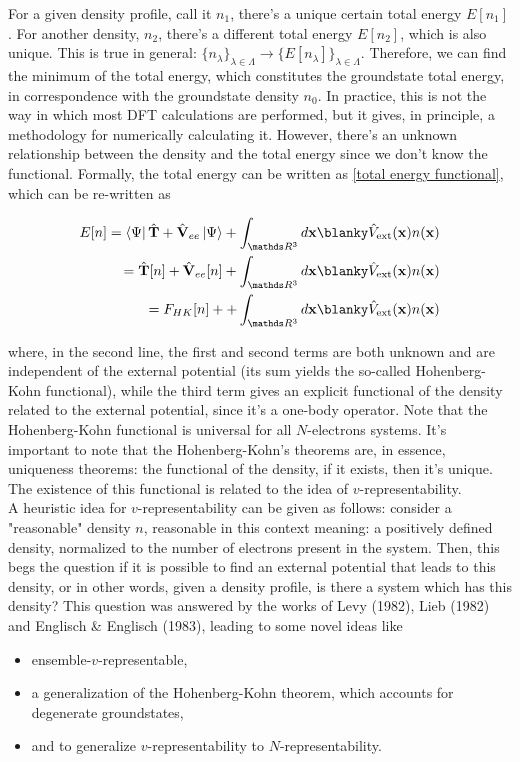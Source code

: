 \documentclass{homework}
\begin{document}
For a given density profile, call it $n_1$, there's a unique certain total energy $E[n_1]$. For another density, $n_2$, there's a different total energy $E[n_2]$, which is also unique. This is true in general: $\{n_\lambda\}_{\lambda \in \Lambda} \rightarrow \{E[n_\lambda]\}_{\lambda \in \Lambda}$. Therefore, we can find the minimum of the total energy, which constitutes the groundstate total energy, in correspondence with the groundstate density $n_0$. In practice, this is not the way in which most DFT calculations are performed, but it gives, in principle, a methodology for numerically calculating it. However, there's an unknown relationship between the density and the total energy since we don't know the functional. Formally, the total energy can be written as \eqref{total energy functional}, which can be re-written as 

\begin{align}
    E[n] = \bra{\Psi} \hat{\bf T}+\hat{\bf V}_{ee}\ket{\Psi} + \int_{\R^3} d{\bf x} \blanky \hat{V}_{\textnormal{ext}}({\bf x}) n({\bf x}) \\
    = \hat{\bf T}[n] + \hat{\bf V}_{ee}[n] + \int_{\R^3} d{\bf x} \blanky \hat{V}_{\textnormal{ext}}({\bf x}) n({\bf x}) \\
    = F_{HK}[n] + + \int_{\R^3} d{\bf x} \blanky \hat{V}_{\textnormal{ext}}({\bf x}) n({\bf x})
\end{align}

where, in the second line, the first and second terms are both unknown and are independent of the external potential (its sum yields the so-called Hohenberg-Kohn functional), while the third term gives an explicit functional of the density related to the external potential, since it's a one-body operator. Note that the Hohenberg-Kohn functional is universal for all $N$-electrons systems. It's important to note that the Hohenberg-Kohn's theorems are, in essence, uniqueness theorems: the functional of the density, if it exists, then it's unique. The existence of this functional is related to the idea of $v$-representability. \\

A heuristic idea for $v$-representability can be given as follows: consider a "reasonable" density $n$, reasonable in this context meaning: a positively defined density, normalized to the number of electrons present in the system. Then, this begs the question if it is possible to find an external potential that leads to this density, or in other words, given a density profile, is there a system which has this density?
This question was answered by the works of Levy (1982), Lieb (1982) and Englisch \& Englisch (1983), leading to some novel ideas like 

\begin{itemize}
    \item ensemble-$v$-representable, 
    \item a generalization of the Hohenberg-Kohn theorem, which accounts for degenerate groundstates,
    \item and to generalize $v$-representability to $N$-representability. \\
\end{itemize}
\end{document}
